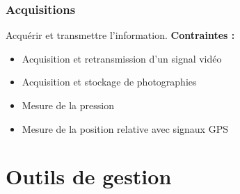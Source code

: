 \documentclass[a4paper,11pt]{report}
\begin{document}
						\subsection{Acquisitions}
								Acquérir et transmettre l'information. \newline
								\textbf{Contraintes :}
								\begin{itemize}
										\item Acquisition et retransmission d'un signal vidéo
										\item Acquisition et stockage de photographies
										\item Mesure de la pression
										\item Mesure de la position relative avec signaux GPS
								\end{itemize}

\chapter{Outils de gestion}
\end{document}
